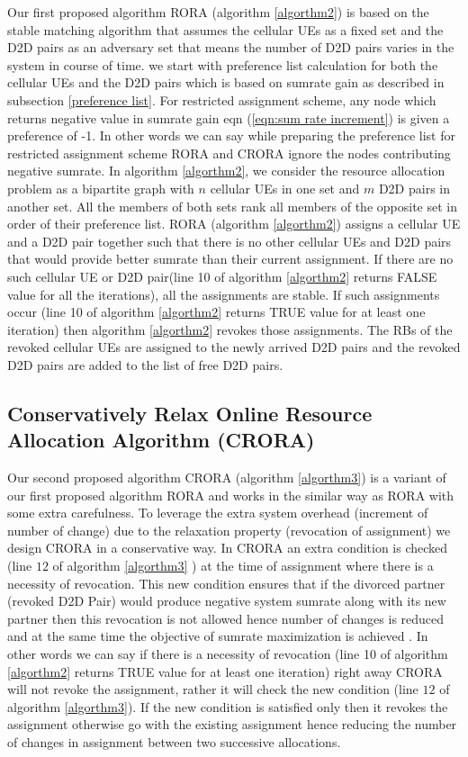 \documentclass[times]{dacauth}
\begin{document}
\medskip
\noindent
Our first proposed algorithm RORA (algorithm \ref{algorthm2}) is based on the stable matching algorithm \cite{knuth1976mariages} that assumes the cellular UEs as a fixed set and the D2D pairs as an adversary set that means the number of D2D pairs varies in the system in course of time. 
we start with preference list calculation for both the cellular UEs and the D2D pairs which is based on sumrate gain as described in subsection \ref{preference list}. For restricted assignment scheme, any node which returns negative value in sumrate gain eqn (\ref{eqn:sum rate increment}) is given a preference of -1. In other words we can say while preparing the preference list for restricted assignment scheme RORA and CRORA ignore the nodes contributing negative sumrate. In algorithm \ref{algorthm2}, we consider the resource allocation problem as a bipartite graph with $n$ cellular UEs in one set and $m$ D2D pairs in another set. All the members of both sets rank all members of the opposite set in order of their preference list. RORA (algorithm \ref{algorthm2}) assigns a cellular UE and a D2D pair together such that there is no other cellular UEs and D2D pairs that would provide better sumrate  than their current assignment. If there are no such cellular UE or D2D pair(line 10 of algorithm \ref{algorthm2} returns FALSE value for all the iterations), all the assignments are stable. If such assignments occur (line 10 of algorithm \ref{algorthm2} returns TRUE value for at least one iteration) then algorithm \ref{algorthm2} revokes those assignments. The RBs of the revoked cellular UEs are assigned to the newly arrived D2D pairs and the revoked D2D pairs are added to the list of free D2D pairs. 
 
 
\subsection{Conservatively Relax Online Resource Allocation Algorithm (CRORA)}
 
\noindent
Our second proposed algorithm CRORA (algorithm \ref{algorthm3}) is a variant of our first proposed algorithm RORA and works in the similar way as RORA with some extra carefulness. To leverage the extra system overhead (increment of number of change) due to the relaxation property (revocation of assignment) we design CRORA in a conservative way. In CRORA an extra condition is checked (line $12$ of algorithm \ref{algorthm3} ) at the time of assignment where there is a necessity of revocation. This new condition ensures that if the divorced partner (revoked D2D Pair) would produce negative system sumrate along with its new partner then this revocation is not allowed hence number of changes is reduced and at the same time the objective of sumrate maximization is achieved . In other words we can say if there is a necessity of revocation (line 10 of algorithm \ref{algorthm2} returns TRUE value for at least one iteration) right away CRORA will not revoke the assignment, rather it will check the new condition (line $12$ of algorithm \ref{algorthm3}). If the new condition is satisfied only then it revokes the assignment otherwise go with the existing assignment hence reducing the number of changes in assignment between two successive allocations.
 
\end{document}
